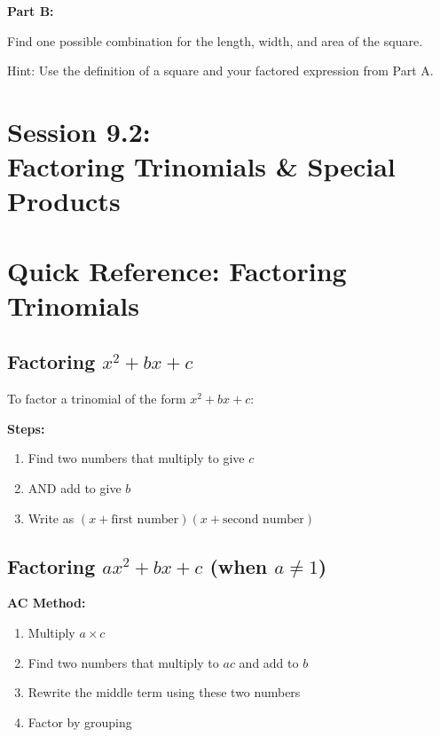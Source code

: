 \documentclass[12pt]{article}
\begin{document}
			\vspace{3cm}

            \textbf{Part B:}
            
            Find one possible combination for the length, width, and area of the square.

            Hint: Use the definition of a square and your factored expression from Part A.

			\newpage

	\section*{Session 9.2: \\ Factoring Trinomials \& Special Products}

	\section*{Quick Reference: Factoring Trinomials}

		\subsection*{Factoring $x^2 + bx + c$}

			To factor a trinomial of the form $x^2 + bx + c$:

			\textbf{Steps:}
			\begin{enumerate}
				\item Find two numbers that multiply to give $c$
				\item AND add to give $b$
				\item Write as $(x + \text{first number})(x + \text{second number})$
			\end{enumerate}

		\subsection*{Factoring $ax^2 + bx + c$ (when $a \neq 1$)}

			\textbf{AC Method:}
			\begin{enumerate}
				\item Multiply $a \times c$
				\item Find two numbers that multiply to $ac$ and add to $b$
				\item Rewrite the middle term using these two numbers
				\item Factor by grouping
			\end{enumerate}
\end{document}
